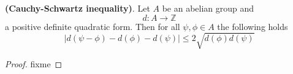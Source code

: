\begin{lemma}
 \textbf{(Cauchy-Schwartz inequality)}. Let $A$ be an abelian group and
$$ d: A \rightarrow \mathbb{Z} $$
a positive definite quadratic form. Then for all $\psi, \phi \in A$ the following holds
$$ |d(\psi-\phi)-d(\phi)-d(\psi)| \leq 2 \sqrt{d(\phi)d(\psi)} $$
\end{lemma}
\begin{proof}
 fixme
\end{proof}
